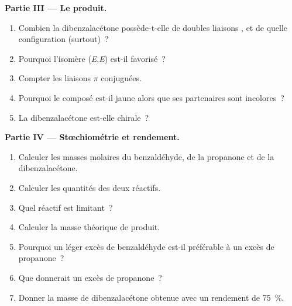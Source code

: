 \begin{problem}
\medskip
\noindent\textbf{Partie III --- Le produit.}
\begin{enumerate}[resume]
  \item Combien la dibenzalacétone possède-t-elle de doubles liaisons , et de quelle configuration (surtout)~?
  \item Pourquoi l'isomère (\textit{E},\textit{E}) est-il favorisé~?
  \item Compter les liaisons $\pi$ conjuguées.
  \item Pourquoi le composé est-il jaune alors que ses partenaires sont incolores~?
  \item La dibenzalacétone est-elle chirale~?
\end{enumerate}

\medskip
\noindent\textbf{Partie IV --- Stœchiométrie et rendement.}
\begin{enumerate}[resume]
  \item Calculer les masses molaires du benzaldéhyde, de la propanone et de la dibenzalacétone.
  \item Calculer les quantités des deux réactifs.
  \item Quel réactif est limitant~?
  \item Calculer la masse théorique de produit.
  \item Pourquoi un léger excès de benzaldéhyde est-il préférable à un excès de propanone~?
  \item Que donnerait un excès de propanone~?
  \item Donner la masse de dibenzalacétone obtenue avec un rendement de 75~\%.
\end{enumerate}
\end{problem}
